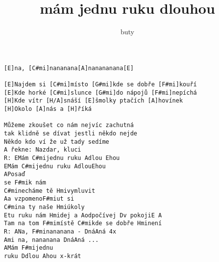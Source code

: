 \author{buty}
\title{mám jednu ruku dlouhou}
\maketitle
\begin{verbatim}
[E]na, [C#mi]nananana[A]nanananana[E]

[E]Najdem si [C#mi]místo [G#mi]kde se dobře [F#mi]kouří
[E]Kde horké [C#mi]slunce [G#mi]do nápojů [F#mi]nepíchá
[H]Kde vítr [H/A]snáší [E]šmolky ptačích [A]hovínek
[H]Okolo [A]nás a [H]říká

Můžeme zkoušet co nám nejvíc zachutná
tak klidně se dívat jestli někdo nejde
Někdo kdo ví že už tady sedíme
A řekne: Nazdar, kluci
R: EMám C#mijednu ruku Adlou Ehou
EMám C#mijednu ruku AdlouEhou
APosaď
se F#mik nám
C#minecháme tě Hmivymluvit
Aa vzpomenoF#miut si
C#mina ty naše Hmiúkoly
Etu ruku nám Hmidej a Aodpočívej Dv pokojiE A
Tam na tom F#mimístě C#mikde se dobře Hminení
R: ANa, F#minananana - DnáAná 4x
Ami na, nananana DnáAná ...
AMám F#mijednu
ruku Ddlou Ahou x-krát

\end{verbatim}